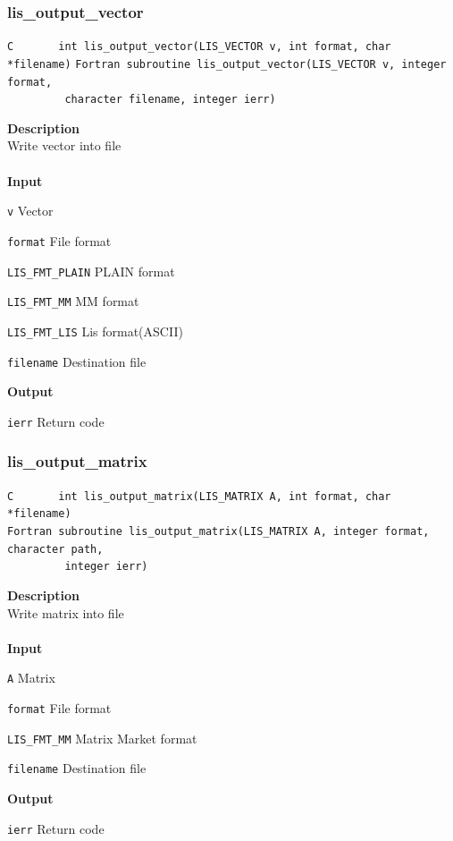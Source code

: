 \documentclass[a4paper]{article}
\newcommand{\namelistlabel}[1]{\mbox{#1}\hfill}
\newenvironment{namelist}[1]{%
 \begin{list}{}
  {\let\makelabel\namelistlabel
  \settowidth{\labelwidth}{#1}
  \setlength{\leftmargin}{1.1\labelwidth}}
}{%
\end{list}}
\begin{document}
  \subsubsection{lis\_output\_vector}
\begin{screen}
\verb|C       int lis_output_vector(LIS_VECTOR v, int format, char *filename)|
\verb|Fortran subroutine lis_output_vector(LIS_VECTOR v, integer format,|\\
\verb|         character filename, integer ierr) |
\end{screen}
{\bf Description}\\
\indent
Write vector into file
\\ \\
\noindent
{\bf Input}
\begin{namelist}{XXXXXXXXXXXXXXXXXXXX}
\item[\tt v] Vector
\item[\tt format] File format
\begin{namelist}{XXXXXXXXXXXXXXXXXXXX}
\item[\tt LIS\_FMT\_PLAIN] PLAIN format
\item[\tt LIS\_FMT\_MM] MM format
\item[\tt LIS\_FMT\_LIS] Lis format(ASCII)
\end{namelist}
\item[\tt filename] Destination file
\end{namelist}
{\bf Output}
\begin{namelist}{XXXXXXXXXXXXXXXXXXXX}
\item[\tt ierr] Return code
\end{namelist}

  \subsubsection{lis\_output\_matrix}
\begin{screen}
\verb|C       int lis_output_matrix(LIS_MATRIX A, int format, char *filename)|\\
\verb|Fortran subroutine lis_output_matrix(LIS_MATRIX A, integer format, character path,|\\
\verb|         integer ierr)|
\end{screen}
{\bf Description}\\
\indent
Write matrix into file
\\ \\
\noindent
{\bf Input}
\begin{namelist}{XXXXXXXXXXXXXXXXXXXX}
\item[\tt A] Matrix
\item[\tt format] File format
\begin{namelist}{XXXXXXXXXXXXXXXXXXXX}
\item[\tt LIS\_FMT\_MM] Matrix Market format
\end{namelist}
\item[\tt filename] Destination file
\end{namelist}
{\bf Output}
\begin{namelist}{XXXXXXXXXXXXXXXXXXXX}
\item[\tt ierr] Return code
\end{namelist}
\end{document}
